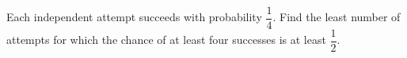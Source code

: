 Each independent attempt succeeds with probability $\dfrac{1}{4}$. Find the least number of attempts for which the chance of at least four successes is at least $\dfrac{1}{2}$.
